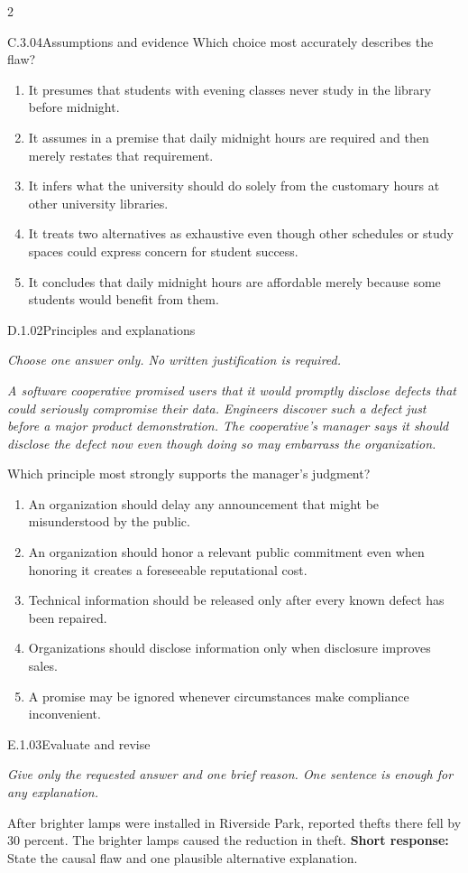 \documentclass[9pt]{extarticle}
\newcommand{\choice}[1]{\item #1}
\begin{document}
\begin{multicols}{2}
\begin{DenseCoreProblem}{C.3.04}{Assumptions and evidence}
Which choice most accurately describes the flaw?
\begin{enumerate}[label=(\alph*)]
  \choice{It presumes that students with evening classes never study in the library before midnight.}
  \choice{It assumes in a premise that daily midnight hours are required and then merely restates that requirement.}
  \choice{It infers what the university should do solely from the customary hours at other university libraries.}
  \choice{It treats two alternatives as exhaustive even though other schedules or study spaces could express concern for student success.}
  \choice{It concludes that daily midnight hours are affordable merely because some students would benefit from them.}
\end{enumerate}
\end{DenseCoreProblem}
\begin{DenseCoreProblem}{D.1.02}{Principles and explanations}
{\scriptsize\textit{Choose one answer only. No written justification is required.}\par}
\emph{A software cooperative promised users that it would promptly disclose defects that could seriously compromise their data. Engineers discover such a defect just before a major product demonstration. The cooperative's manager says it should disclose the defect now even though doing so may embarrass the organization.}

Which principle most strongly supports the manager's judgment?
\begin{enumerate}[label=(\alph*)]
  \choice{An organization should delay any announcement that might be misunderstood by the public.}
  \choice{An organization should honor a relevant public commitment even when honoring it creates a foreseeable reputational cost.}
  \choice{Technical information should be released only after every known defect has been repaired.}
  \choice{Organizations should disclose information only when disclosure improves sales.}
  \choice{A promise may be ignored whenever circumstances make compliance inconvenient.}
\end{enumerate}
\end{DenseCoreProblem}
\begin{DenseCoreProblem}{E.1.03}{Evaluate and revise}
{\scriptsize\textit{Give only the requested answer and one brief reason. One sentence is enough for any explanation.}\par}
After brighter lamps were installed in Riverside Park, reported thefts there fell by 30 percent. The brighter lamps caused the reduction in theft.
\textbf{Short response:} State the causal flaw and one plausible alternative explanation.
\end{DenseCoreProblem}
\end{multicols}
\end{document}
